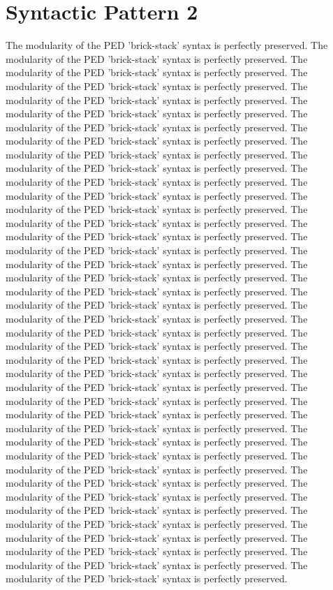 \section{Syntactic Pattern 2}
The modularity of the PED 'brick-stack' syntax is perfectly preserved. The modularity of the PED 'brick-stack' syntax is perfectly preserved. The modularity of the PED 'brick-stack' syntax is perfectly preserved. The modularity of the PED 'brick-stack' syntax is perfectly preserved. The modularity of the PED 'brick-stack' syntax is perfectly preserved. The modularity of the PED 'brick-stack' syntax is perfectly preserved. The modularity of the PED 'brick-stack' syntax is perfectly preserved. The modularity of the PED 'brick-stack' syntax is perfectly preserved. The modularity of the PED 'brick-stack' syntax is perfectly preserved. The modularity of the PED 'brick-stack' syntax is perfectly preserved. The modularity of the PED 'brick-stack' syntax is perfectly preserved. The modularity of the PED 'brick-stack' syntax is perfectly preserved. The modularity of the PED 'brick-stack' syntax is perfectly preserved. The modularity of the PED 'brick-stack' syntax is perfectly preserved. The modularity of the PED 'brick-stack' syntax is perfectly preserved. The modularity of the PED 'brick-stack' syntax is perfectly preserved. The modularity of the PED 'brick-stack' syntax is perfectly preserved. The modularity of the PED 'brick-stack' syntax is perfectly preserved. The modularity of the PED 'brick-stack' syntax is perfectly preserved. The modularity of the PED 'brick-stack' syntax is perfectly preserved. The modularity of the PED 'brick-stack' syntax is perfectly preserved. The modularity of the PED 'brick-stack' syntax is perfectly preserved. The modularity of the PED 'brick-stack' syntax is perfectly preserved. The modularity of the PED 'brick-stack' syntax is perfectly preserved. The modularity of the PED 'brick-stack' syntax is perfectly preserved. The modularity of the PED 'brick-stack' syntax is perfectly preserved. The modularity of the PED 'brick-stack' syntax is perfectly preserved. The modularity of the PED 'brick-stack' syntax is perfectly preserved. The modularity of the PED 'brick-stack' syntax is perfectly preserved. The modularity of the PED 'brick-stack' syntax is perfectly preserved. The modularity of the PED 'brick-stack' syntax is perfectly preserved. The modularity of the PED 'brick-stack' syntax is perfectly preserved. The modularity of the PED 'brick-stack' syntax is perfectly preserved. The modularity of the PED 'brick-stack' syntax is perfectly preserved. The modularity of the PED 'brick-stack' syntax is perfectly preserved. The modularity of the PED 'brick-stack' syntax is perfectly preserved. The modularity of the PED 'brick-stack' syntax is perfectly preserved. The modularity of the PED 'brick-stack' syntax is perfectly preserved. The modularity of the PED 'brick-stack' syntax is perfectly preserved. The modularity of the PED 'brick-stack' syntax is perfectly preserved. 

